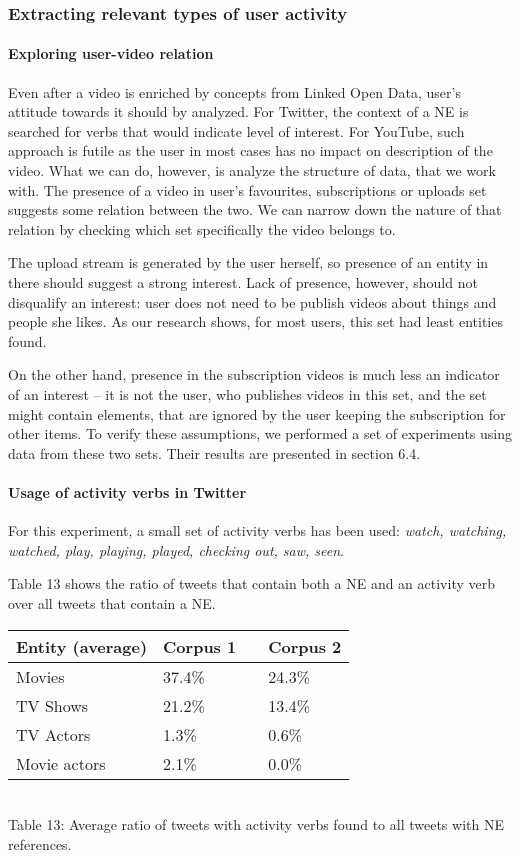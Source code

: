 \subsubsection{Extracting relevant types of user activity}

\paragraph{Exploring user-video relation} Even after a video is enriched by
concepts from Linked Open Data, user's attitude towards it should by analyzed.
For Twitter, the context of a NE is searched for verbs that would indicate
level of interest. For YouTube, such approach is futile as the user in most
cases has no impact on description of the video. What we can do, however, is
analyze the structure of data, that we work with. The presence of a video in
user's favourites, subscriptions or uploads set suggests some relation between
the two. We can narrow down the nature of that relation by checking which set
specifically the video belongs to.

The upload stream is generated by the user herself, so presence of an entity in
there should suggest a strong interest. Lack of presence, however, should not
disqualify an interest: user does not need to be publish videos about things
and people she likes. As our research shows, for most users, this set had least
entities found.

On the other hand, presence in the subscription videos is much less an
indicator of an interest -- it is not the user, who publishes videos in this
set, and the set might contain elements, that are ignored by the user keeping
the subscription for other items. To verify these assumptions, we performed a
set of experiments using data from these two sets. Their results are presented
in section 6.4.

\paragraph{Usage of activity verbs in Twitter}
For this experiment, a small set of activity verbs has been used: \textit{watch, watching, watched,
play, playing, played, checking out, saw, seen}.

Table 13 shows the ratio of tweets that contain both a NE and an activity verb over all
tweets that contain a NE.

\begin{center}
  \begin{tabular}{ | p{4cm} | p{2cm} | p{1cm}| p{2cm} | } \hline
    Entity (average) & Corpus 1 & & Corpus 2 \\ \hline
    Movies & 37.4\% & & 24.3\% \\ \hline
    TV Shows & 21.2\% & & 13.4\% \\ \hline
    TV Actors & 1.3\% & & 0.6\% \\ \hline
    Movie actors & 2.1\% & & 0.0\% \\ \hline
  \end{tabular} \\
  Table 13: Average ratio of tweets with activity verbs found to all tweets with NE references. \\
\end{center}

